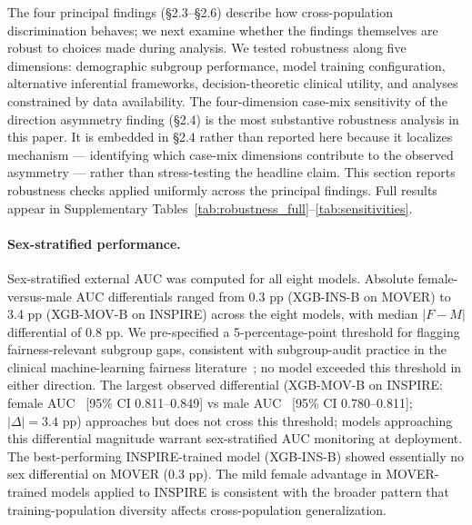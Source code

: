 The four principal findings (§2.3--§2.6) describe how cross-population discrimination behaves; we next examine whether the findings themselves are robust to choices made during analysis. We tested robustness along five dimensions: demographic subgroup performance, model training configuration, alternative inferential frameworks, decision-theoretic clinical utility, and analyses constrained by data availability. The four-dimension case-mix sensitivity of the direction asymmetry finding (§2.4) is the most substantive robustness analysis in this paper. It is embedded in §2.4 rather than reported here because it localizes mechanism --- identifying which case-mix dimensions contribute to the observed asymmetry --- rather than stress-testing the headline claim. This section reports robustness checks applied uniformly across the principal findings. Full results appear in Supplementary Tables~\ref{tab:robustness_full}--\ref{tab:sensitivities}.

\paragraph{Sex-stratified performance.} Sex-stratified external AUC was computed for all eight models. Absolute female-versus-male AUC differentials ranged from 0.3 pp (XGB-INS-B on MOVER) to 3.4 pp (XGB-MOV-B on INSPIRE) across the eight models, with median $|F-M|$ differential of 0.8 pp. We pre-specified a 5-percentage-point threshold for flagging fairness-relevant subgroup gaps, consistent with subgroup-audit practice in the clinical machine-learning fairness literature~\cite{SeyyedKalantari2021,Pfohl2021}; no model exceeded this threshold in either direction. The largest observed differential (XGB-MOV-B on INSPIRE: female AUC \pnSexAucXgbMovBFemaleInspire\ [95\% CI 0.811--0.849] vs male AUC \pnSexAucXgbMovBMaleInspire\ [95\% CI 0.780--0.811]; $|\Delta| = 3.4$ pp) approaches but does not cross this threshold; models approaching this differential magnitude warrant sex-stratified AUC monitoring at deployment. The best-performing INSPIRE-trained model (XGB-INS-B) showed essentially no sex differential on MOVER (0.3 pp). The mild female advantage in MOVER-trained models applied to INSPIRE is consistent with the broader pattern that training-population diversity affects cross-population generalization.

